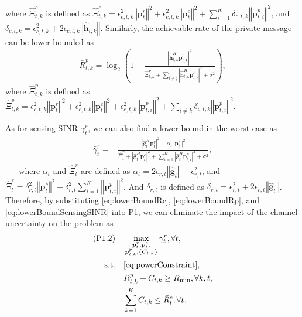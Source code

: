 \documentclass[twocolumn,journal]{IEEEtran}
\begin{document}
where \(\hat{\Xi}^{c}_{t,k}\) is defined as \(\hat{\Xi}^{c}_{t,k} = \epsilon_{c,t,k}^2\left\Vert \boldsymbol{p}_t^{r} \right\Vert^2 + \epsilon_{c,t,k}^2\left\Vert  \boldsymbol{p}_t^{c} \right\Vert^2 + \sum_{i=1}^{K} \delta_{c,t,k} \left\Vert \boldsymbol{p}^{p}_{t,i} \right\Vert^2\), and \(\delta_{c,t,k} = \epsilon_{c,t,k}^2 + 2\epsilon_{c,t,k}\left\Vert \hat{\boldsymbol{h}}_{t,k} \right\Vert\). Similarly, the achievable rate of the private message can be lower-bounded as
\begin{align}
 \bar{R}^{p}_{t,k} = \log_2\left(1 + \frac{\left| \hat{\boldsymbol{h}}^{H}_{t,k}\boldsymbol{p}^{p}_{t,k} \right|^2}{\hat{\Xi}^{p}_{t,k} +  \sum_{i\neq j}\left| \hat{\boldsymbol{h}}^{H}_{t,k}\boldsymbol{p}^{p}_{t,i}\right|^2 + \sigma^2}\right), \label{eq:lowerBoundRp}
\end{align}
where \(\hat{\Xi}^{p}_{t,k}\) is defined as \(\hat{\Xi}^{p}_{t,k} = \epsilon_{c,t,k}^2\left\Vert \boldsymbol{p}_t^{r} \right\Vert^2 + \epsilon_{c,t,k}^2\left\Vert  \boldsymbol{p}_t^{c} \right\Vert^2 + \epsilon_{c,t,k}^2\left\Vert  \boldsymbol{p}^{p}_{t,i} \right\Vert^2 + \sum_{i\neq k}\delta_{c,t,k}\left\Vert \boldsymbol{p}^{p}_{t,i} \right\Vert^2\). 

As for sensing SINR \(\gamma_{t}^{r}\), we can also find a lower bound in the worst case as
\begin{align}
 \bar{\gamma}_{t}^{r} = &\frac{\left| \hat{\boldsymbol{g}}^{H}_{t}\boldsymbol{p}^{r}_{t} \right|^2-\alpha_t\left\Vert \boldsymbol{p}^{r}_{t}\right\Vert^2}
 {\hat{\Xi}^{r}_{t} + \left| \hat{\boldsymbol{g}}^{H}_{t}\boldsymbol{p}^{c}_{t}\right|^2 + \sum_{i=1}^{K}\left| \hat{\boldsymbol{g}}^{H}_{t}\boldsymbol{p}^{p}_{t,i}\right|^2 + \sigma^2},\label{eq:lowerBoundSensingSINR}
\end{align}    
where \(\alpha_t\) and \(\hat{\Xi}^{r}_{t}\) are defined as \(\alpha_t =2\epsilon_{r,t}\left\Vert \hat{\boldsymbol{g}}_{t} \right\Vert - \epsilon_{r,t}^2 \), and \(\hat{\Xi}^{r}_{t} = \delta_{r,t}^2\left\Vert \boldsymbol{p}_t^{c} \right\Vert^2 + \delta_{r,t}^2\sum_{i=1}^{K}\left\Vert \boldsymbol{p}^{p}_{t,i} \right\Vert^2\). And \(\delta_{r,t}\) is defined as \(\delta_{r,t} = \epsilon_{r,t}^2 + 2\epsilon_{r,t}\left\Vert \hat{\boldsymbol{g}}_{t} \right\Vert\).
Therefore, by substituting \eqref{eq:lowerBoundRc}, \eqref{eq:lowerBoundRp}, and \eqref{eq:lowerBoundSensingSINR} into P1, we can eliminate the impact of the channel uncertainty on the problem as
\begin{subequations}
\begin{align}
 (\text{P1.2})\quad&\mathop{\max}_{{\substack{\boldsymbol{p}^{r}_{t},\boldsymbol{p}^{c}_{t},\\
 \boldsymbol{p}^{p}_{t,k},\left\{C_{t,k}\right\}}}}\bar{\gamma}_t^{r}, \forall t,\label{eq:gammaR2}\\
 \text{s.t.}\quad&\eqref{eq:powerConstraint},\notag\\
 \quad&\bar{R}^{p}_{t,k} + C_{t,k} \geq R_{\min}, \forall k,t,\label{eq:rateConstraint2}\\
    & \sum_{k=1}^{K} C_{t,k} \leq \bar{R}^{c}_{t}, \forall t. \label{eq:splittedRateConstraint2}
\end{align}
\end{subequations}
\end{document}
